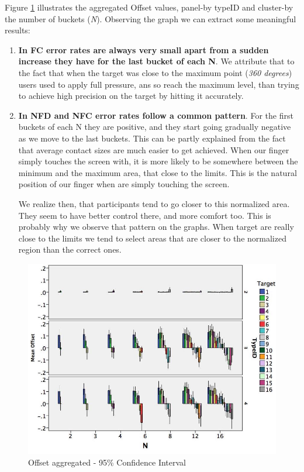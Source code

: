 Figure \ref{fig:meanOffset} illustrates the aggregated Offset values, panel-by typeID and cluster-by the number of buckets (\emph{N}). Observing the graph we can extract some meaningful results:

\begin{enumerate}
    \item \textbf{In FC error rates are always very small apart from a sudden increase they have for the last bucket of each N}. We attribute that to the fact that when the target was close to the maximum point (\emph{360 degrees}) users used to apply full pressure, ans so reach the maximum level, than trying to achieve high precision on the target by hitting it accurately. 

    \item \textbf{In NFD and NFC error rates follow a common pattern}. For the first buckets of each N they are positive, and they start going gradually negative as we move to the last buckets. This can be partly explained from the fact that average contact sizes are much easier to get achieved. When our finger simply touches the screen with, it is more likely to be somewhere between the minimum and the maximum area, that close to the limits. This is the natural position of our finger when are simply touching the screen.

    We realize then, that participants tend to go closer to this normalized area. They seem to have better control there, and more comfort too. This is probably why we observe that pattern on the graphs. When target are really close to the limits we tend to select areas that are closer to the normalized region than the correct ones.
\end{enumerate}
\begin{figure}[H]
\centering
\includegraphics[width=\textwidth]{figures/meanOffset}
\caption{Offset aggregated - 95\% Confidence Interval}
\label{fig:meanOffset}
\end{figure}


